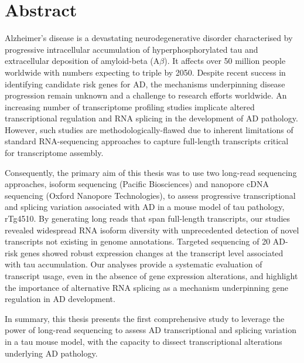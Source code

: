 \chapter*{Abstract}

Alzheimer's disease is a devastating neurodegenerative disorder characterised by progressive intracellular accumulation of hyperphosphorylated tau and extracellular deposition of amyloid-beta (A$\beta$). It affects over 50 million people worldwide with numbers expecting to triple by 2050. Despite recent success in identifying candidate risk genes for AD, the mechanisms underpinning disease progression remain unknown and a challenge to research efforts worldwide. An increasing number of transcriptome profiling studies implicate altered transcriptional regulation and RNA splicing in the development of AD pathology. However, such studies are methodologically-flawed due to inherent limitations of standard RNA-sequencing approaches to capture full-length transcripts critical for transcriptome assembly.  

Consequently, the primary aim of this thesis was to use two long-read sequencing approaches, isoform sequencing (Pacific Biosciences) and nanopore cDNA sequencing (Oxford Nanopore Technologies), to assess progressive transcriptional and splicing variation associated with AD in a mouse model of tau pathology, rTg4510. By generating long reads that span full-length transcripts, our studies revealed widespread RNA isoform diversity with unprecedented detection of novel transcripts not existing in genome annotations. Targeted sequencing of 20 AD-risk genes showed robust expression changes at the transcript level associated with tau accumulation. Our analyses provide a systematic evaluation of transcript usage, even in the absence of gene expression alterations, and highlight the importance of alternative RNA splicing as a mechanism underpinning gene regulation in AD development. 

In summary, this thesis presents the first comprehensive study to leverage the power of long-read sequencing to assess AD transcriptional and splicing variation in a tau mouse model, with the capacity to dissect transcriptional alterations underlying AD pathology.       